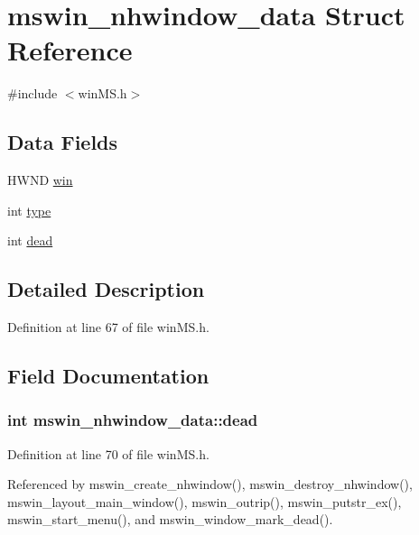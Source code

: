 \hypertarget{structmswin__nhwindow__data}{\section{mswin\+\_\+nhwindow\+\_\+data Struct Reference}
\label{structmswin__nhwindow__data}
}


{\ttfamily \#include $<$win\+M\+S.\+h$>$}

\subsection*{Data Fields}
\begin{DoxyCompactItemize}
\item 
H\+W\+N\+D \hyperlink{structmswin__nhwindow__data_ae10a423b314e3c84ef33e6c57f7447d4}{win}
\item 
int \hyperlink{structmswin__nhwindow__data_aacbfb89655cec852a2e1d64e626392ec}{type}
\item 
int \hyperlink{structmswin__nhwindow__data_acd523d0a823e7b01d8ae620ec69fd953}{dead}
\end{DoxyCompactItemize}


\subsection{Detailed Description}


Definition at line 67 of file win\+M\+S.\+h.



\subsection{Field Documentation}
\hypertarget{structmswin__nhwindow__data_acd523d0a823e7b01d8ae620ec69fd953}{
\subsubsection[{dead}]{\setlength{\rightskip}{0pt plus 5cm}int mswin\+\_\+nhwindow\+\_\+data\+::dead}}\label{structmswin__nhwindow__data_acd523d0a823e7b01d8ae620ec69fd953}


Definition at line 70 of file win\+M\+S.\+h.



Referenced by mswin\+\_\+create\+\_\+nhwindow(), mswin\+\_\+destroy\+\_\+nhwindow(), mswin\+\_\+layout\+\_\+main\+\_\+window(), mswin\+\_\+outrip(), mswin\+\_\+putstr\+\_\+ex(), mswin\+\_\+start\+\_\+menu(), and mswin\+\_\+window\+\_\+mark\+\_\+dead().

